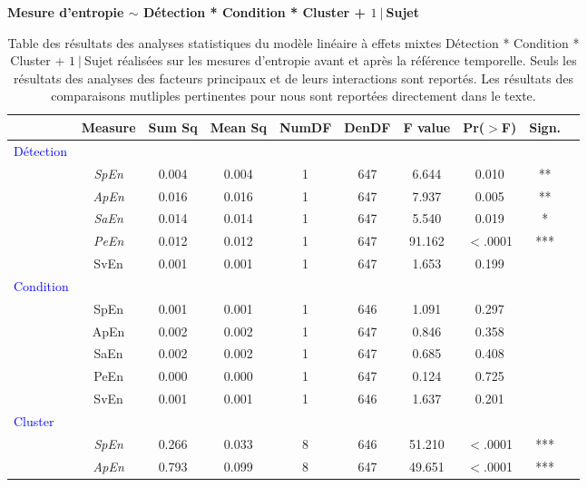 \begin{table}[!t]
\centering
\scriptsize
\caption[Table des résultats des analyses statistiques pour les mesures d'entropie]{Table des résultats des analyses statistiques du modèle linéaire à effets mixtes Détection * Condition * Cluster + $1~|~$Sujet réalisées sur les mesures d'entropie avant et après la référence temporelle. Seuls les résultats des analyses des facteurs principaux et de leurs interactions sont reportés. Les résultats des comparaisons mutliples pertinentes pour nous sont reportées directement dans le texte.}
\label{tab:table5statsmesuresentropie}

\textbf{Mesure d'entropie $\sim$ Détection * Condition * Cluster + $1~|~$Sujet}

\begin{tabular}{|l|*{9}{c|}}
\hline
& \textbf{Measure} & \textbf{Sum Sq} & \textbf{Mean Sq} & \textbf{NumDF} & \textbf{DenDF} & \textbf{F value} & \textbf{Pr($>$F)} & \textbf{Sign.} \\ 
\hline
\textcolor{blue}{Détection} & & & & & & & & \\ 
\hline
& \textit{SpEn} & 0.004 & 0.004 & 1 & 647 & 6.644 & 0.010 & ** \\ 
& \textit{ApEn} & 0.016 & 0.016 & 1 & 647 & 7.937 & 0.005 & ** \\ 
& \textit{SaEn} & 0.014 & 0.014 & 1 & 647 & 5.540 & 0.019 & * \\ 
& \textit{PeEn} & 0.012 & 0.012 & 1 & 647 & 91.162 & $<$.0001 & *** \\ 
& SvEn & 0.001 & 0.001 & 1 & 647 & 1.653 & 0.199 & \\ 
\hline
\textcolor{blue}{Condition} & & & & & & & & \\ 
\hline
& SpEn & 0.001 & 0.001 & 1 & 646 & 1.091 & 0.297 & \\ 
& ApEn & 0.002 & 0.002 & 1 & 647 & 0.846 & 0.358 & \\ 
& SaEn & 0.002 & 0.002 & 1 & 647 & 0.685 & 0.408 & \\ 
& PeEn & 0.000 & 0.000 & 1 & 647 & 0.124 & 0.725 & \\ 
& SvEn & 0.001 & 0.001 & 1 & 646 & 1.637 & 0.201 & \\ 
\hline
\textcolor{blue}{Cluster} & & & & & & & & \\ 
\hline
& \textit{SpEn} & 0.266 & 0.033 & 8 & 646 & 51.210 & $<$.0001 & *** \\ 
& \textit{ApEn} & 0.793 & 0.099 & 8 & 647 & 49.651 & $<$.0001 & *** \\ 

\end{tabular}
\end{table}
